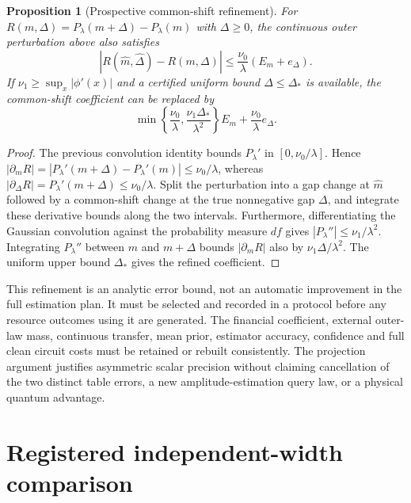 \documentclass[11pt]{article}
\newtheorem{proposition}[theorem]{Proposition}
\begin{document}
\begin{proposition}[Prospective common-shift refinement]
\label{prop:raw-common-shift-refinement}
For $R(m,\Delta)=P_\lambda(m+\Delta)-P_\lambda(m)$ with
$\Delta\geq0$, the continuous outer perturbation above also satisfies
\begin{equation}
 |R(\widehat m,\widehat\Delta)-R(m,\Delta)|
 \leq\frac{\nu_0}{\lambda}(E_m+e_\Delta).
\end{equation}
If $\nu_1\geq\sup_x|\phi'(x)|$ and a certified uniform bound
$\Delta\leq\Delta_*$ is available, the common-shift coefficient
can be replaced by
\begin{equation}
 \min\left\{\frac{\nu_0}{\lambda},
              \frac{\nu_1\Delta_*}{\lambda^2}\right\}E_m
       +\frac{\nu_0}{\lambda}e_\Delta.
\end{equation}
\end{proposition}
\begin{proof}
The previous convolution identity bounds $P_\lambda'$ in
$[0,\nu_0/\lambda]$. Hence
$|\partial_mR|=|P_\lambda'(m+\Delta)-P_\lambda'(m)|
\leq\nu_0/\lambda$, whereas
$|\partial_\Delta R|=P_\lambda'(m+\Delta)\leq\nu_0/\lambda$.
Split the perturbation into a gap change at $\widehat m$ followed by
a common-shift change at the true nonnegative gap $\Delta$, and
integrate these derivative bounds along the two intervals. Furthermore,
differentiating the Gaussian convolution against the probability
measure $df$ gives $|P_\lambda''|\leq\nu_1/\lambda^2$.
Integrating $P_\lambda''$ between $m$ and $m+\Delta$ bounds
$|\partial_mR|$ also by $\nu_1\Delta/\lambda^2$.
The uniform upper bound $\Delta_*$ gives the refined coefficient.
\end{proof}

This refinement is an analytic error bound, not an automatic improvement
in the full estimation plan. It must be selected and recorded in a
protocol before any resource outcomes using it are generated. The
financial coefficient, external outer-law mass, continuous transfer,
mean prior, estimator accuracy, confidence and full clean circuit costs
must be retained or rebuilt consistently. The projection argument
justifies asymmetric scalar precision without claiming cancellation of
the two distinct table errors, a new amplitude-estimation query law, or
a physical quantum advantage.

\section{Registered independent-width comparison}
\end{document}
